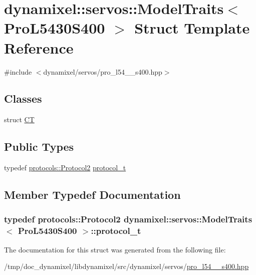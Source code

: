 \hypertarget{structdynamixel_1_1servos_1_1_model_traits_3_01_pro_l5430_s400_01_4}{}\section{dynamixel\+:\+:servos\+:\+:Model\+Traits$<$ Pro\+L5430\+S400 $>$ Struct Template Reference}
\label{structdynamixel_1_1servos_1_1_model_traits_3_01_pro_l5430_s400_01_4}


{\ttfamily \#include $<$dynamixel/servos/pro\+\_\+l54\+\_\+\_\+s400.\+hpp$>$}

\subsection*{Classes}
\begin{DoxyCompactItemize}
\item 
struct \hyperlink{structdynamixel_1_1servos_1_1_model_traits_3_01_pro_l5430_s400_01_4_1_1_c_t}{C\+T}
\end{DoxyCompactItemize}
\subsection*{Public Types}
\begin{DoxyCompactItemize}
\item 
typedef \hyperlink{classdynamixel_1_1protocols_1_1_protocol2}{protocols\+::\+Protocol2} \hyperlink{structdynamixel_1_1servos_1_1_model_traits_3_01_pro_l5430_s400_01_4_aa3ec36bf4f2ad81a0482eb7c5d7fb1f6}{protocol\+\_\+t}
\end{DoxyCompactItemize}


\subsection{Member Typedef Documentation}
\hypertarget{structdynamixel_1_1servos_1_1_model_traits_3_01_pro_l5430_s400_01_4_aa3ec36bf4f2ad81a0482eb7c5d7fb1f6}{}
\subsubsection[{protocol\+\_\+t}]{\setlength{\rightskip}{0pt plus 5cm}typedef {\bf protocols\+::\+Protocol2} {\bf dynamixel\+::servos\+::\+Model\+Traits}$<$ {\bf Pro\+L5430\+S400} $>$\+::{\bf protocol\+\_\+t}}\label{structdynamixel_1_1servos_1_1_model_traits_3_01_pro_l5430_s400_01_4_aa3ec36bf4f2ad81a0482eb7c5d7fb1f6}


The documentation for this struct was generated from the following file\+:\begin{DoxyCompactItemize}
\item 
/tmp/doc\+\_\+dynamixel/libdynamixel/src/dynamixel/servos/\hyperlink{pro__l54__30__s400_8hpp}{pro\+\_\+l54\+\_\+\_\+s400.\+hpp}\end{DoxyCompactItemize}
